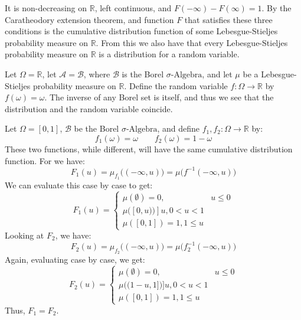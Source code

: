     It is non-decreasing on $\mathbb{R}$, left continuous, and
    $F(\minus\infty)-F(\infty)=1$. By the Caratheodory extension
    theorem, and function $F$ that satisfies these three
    conditions is the cumulative distribution function of some
    Lebesgue-Stieljes probability measure on $\mathbb{R}$. From this
    we also have that every Lebesgue-Stieljes probability measure
    on $\mathbb{R}$ is a distribution for a random variable.
    \begin{example}
        Let $\Omega=\mathbb{R}$, let $\mathcal{A}=\mathcal{B}$,
        where $\mathcal{B}$ is the Borel $\sigma\textrm{-Algebra}$,
        and let $\mu$ be a Lebesgue-Stieljes probability measure
        on $\mathbb{R}$. Define the random variable
        $f:\Omega\rightarrow\mathbb{R}$ by
        $f(\omega)=\omega$. The inverse of any Borel set is itself,
        and thus we see that the distribution and the random
        variable coincide.
    \end{example}
    \begin{example}
        Let $\Omega=[0,1]$, $\mathcal{B}$ be the Borel
        $\sigma\textrm{-Algebra}$, and define
        $f_{1},f_{2}:\Omega\rightarrow\mathbb{R}$ by:
        \begin{equation}
            f_{1}(\omega)=\omega
            \quad\quad
            f_{2}(\omega)=1-\omega
        \end{equation}
        These two functions, while different, will have the same
        cumulative distribution function. For we have:
        \begin{equation}
            F_{1}(u)=\mu_{f_{1}}\big((\minus\infty,u)\big)=
            \mu\big(f^{-1}(\minus\infty,u)\big)
        \end{equation}
        We can evaluate this case by case to get:
        \begin{equation}
            F_{1}(u)=
            \begin{cases}
                \mu(\emptyset)=0,&u\leq{0}\\
                \mu\big([0,u)\big)]u,0<u<1\\
                \mu([0,1])=1,1\leq{u}
            \end{cases}
        \end{equation}
        Looking at $F_{2}$, we have:
        \begin{equation}
            F_{2}(u)=\mu_{f_{2}}\big((\minus\infty,u)\big)
            =\mu\big(f_{2}^{\minus{1}}(\minus\infty,u)\big)
        \end{equation}
        Again, evaluating case by case, we get:
        \begin{equation}
            F_{2}(u)=
            \begin{cases}
                \mu(\emptyset)=0,&u\leq{0}\\
                \mu\big((1-u,1]\big)]u,0<u<1\\
                \mu([0,1])=1,1\leq{u}
            \end{cases}
        \end{equation}
        Thus, $F_{1}=F_{2}$.
    \end{example}
